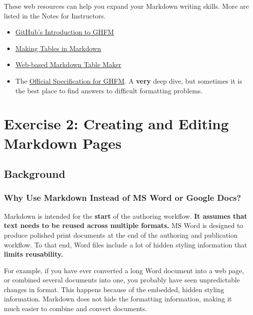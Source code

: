 \documentclass[
]{article}
\providecommand{\tightlist}{%
  \setlength{\itemsep}{0pt}\setlength{\parskip}{0pt}}
\begin{document}
These web resources can help you expand your Markdown writing skills.
More are listed in the Notes for Instructors.

\begin{itemize}
\tightlist
\item
  \href{https://docs.github.com/en/github/writing-on-github/getting-started-with-writing-and-formatting-on-github/basic-writing-and-formatting-syntax}{GitHub's
  Introduction to GHFM}
\item
  \href{https://www.pluralsight.com/guides/working-tables-github-markdown}{Making
  Tables in Markdown}
\item
  \href{https://www.tablesgenerator.com/markdown_tables}{Web-based
  Markdown Table Maker}
\item
  The \href{https://github.github.com/gfm/}{Official Specification for
  GHFM}. A \textbf{very} deep dive, but sometimes it is the best place
  to find answers to difficult formatting problems.
\end{itemize}

\hypertarget{exercise-2-creating-and-editing-markdown-pages}{%
\section{Exercise 2: Creating and Editing Markdown
Pages}\label{exercise-2-creating-and-editing-markdown-pages}}

\hypertarget{background-1}{%
\subsection{Background}\label{background-1}}

\hypertarget{why-use-markdown-instead-of-ms-word-or-google-docs}{%
\subsubsection{Why Use Markdown Instead of MS Word or Google
Docs?}\label{why-use-markdown-instead-of-ms-word-or-google-docs}}

Markdown is intended for the \textbf{start} of the authoring workflow.
\textbf{It assumes that text needs to be reused across multiple
formats.} MS Word is designed to produce polished print documents at the
end of the authoring and publication workflow. To that end, Word files
include a lot of hidden styling information that \textbf{limits
reusability.}

For example, if you have ever converted a long Word document into a web
page, or combined several documents into one, you probably have seen
unpredictable changes in format. This happens because of the embedded,
hidden styling information. Markdown does not hide the formatting
information, making it much easier to combine and convert documents.
\end{document}
